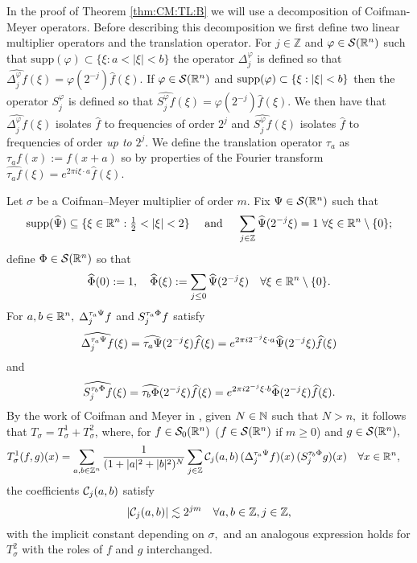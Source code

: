 In the proof of Theorem \ref{thm:CM:TL:B} we will use a decomposition of Coifman-Meyer operators. Before describing this decomposition we first define two linear multiplier operators and the translation operator.
For $j\in\mathbb{Z}$ and $\varphi \in {\mathcal{S}}({{\mathbb R}^n})$ such that $\text{supp}(\varphi) \subset \{\xi : a < |\xi| < b \}$ the operator $\Delta^\varphi_j$ is defined so that $\widehat{\Delta^\varphi_j f}(\xi) = \varphi(2^{-j})\widehat{f}(\xi)$. 
If $\varphi \in {\mathcal{S}}({{\mathbb R}^n})$ and $\text{{\rm{supp}}}(\varphi) \subset \{ \xi : |\xi| < b \}$ then the operator $S^\varphi_j$ is defined so that $\widehat{S^\varphi_j f}(\xi) = \varphi(2^{-j})\widehat{f}(\xi)$.
We then have that $\widehat{\Delta^\varphi_j f}(\xi)$ isolates $\widehat{f}$ to frequencies of order $2^j$ and $\widehat{S^\varphi_j f}(\xi)$ isolates $\widehat{f}$ to frequencies of order \textit{up to} $2^j$. 
We define the translation operator $\tau_a$ as $\tau_a f(x) := f(x+a)$ so by properties of the Fourier transform $\widehat{\tau_a f}(\xi) = e^{2\pi i \xi \cdot a} \widehat{f}(\xi)$.

Let $\sigma$ be a Coifman--Meyer multiplier of order $m.$
Fix $\Psi \in {\mathcal{S}}({{\mathbb R}^n})$ such that 
$$
{\rm{supp}}(\widehat{\Psi}) \subseteq \{ \xi \in {{\mathbb R}^n} : {\textstyle \frac{1}{2}} < |\xi| < 2 \} \quad\text{ and }\quad
\sum_{j\in\mathbb{Z}} \widehat{\Psi}(2^{-j}\xi) = 1 \,\,\forall \xi \in {{\mathbb R}^n} \setminus \{ 0 \};
$$
define $\Phi \in {\mathcal{S}}({{\mathbb R}^n})$ so that
$$
\widehat{\Phi}(0) := 1,\quad \widehat{\Phi}(\xi) := \sum_{j \le 0} \widehat{\Psi}(2^{-j}\xi)\quad \forall \xi \in {{\mathbb R}^n} \setminus \{0\}.$$
For $a,b\in{{\mathbb R}^n},$ $\Delta^{\tau_a \Psi }_{j} f$ and  $S^{ \tau_a \Phi }_{j} f$ satisfy 
$$\widehat{\Delta^{\tau_a \Psi }_{j} f}(\xi)=\widehat{\tau_a\Psi}(2^{-j}\xi)\widehat{f}(\xi)=e^{2\pi i 2^{-j}\xi\cdot a} \widehat{\Psi}(2^{-j}\xi)\widehat{f}(\xi)$$
 and   
 $$\widehat{S^{\tau_b \Phi }_{j} f}(\xi)=\widehat{\tau_b\Phi}(2^{-j}\xi)\widehat{f}(\xi)=e^{2\pi i 2^{-j}\xi\cdot b} \widehat{\Phi}(2^{-j}\xi)\widehat{f}(\xi).$$
By the work of Coifman and Meyer in \cite{MR518170},  given $N\in \mathbb{N}$ such that $N>n,$ it follows that $T_\sigma= T_\sigma^1 + T_\sigma^2$, where, for  $f\in {\mathcal{S}_0}({{\mathbb R}^n})$ ($f\in {\mathcal{S}}({{\mathbb R}^n})$ if $m\ge 0$) and $g\in{\mathcal{S}}({{\mathbb R}^n}),$
\begin{align}\label{eq:decompT1}
T_\sigma^1(f,g)(x) &= \sum_{a,b\in \mathbb{Z}^n} \frac{1}{(1+|a|^2+|b|^2)^N} \sum_{j\in\mathbb{Z}} \mathcal{C}_j(a,b) \,(\Delta^{ \tau_a \Psi }_{j} f)(x)\, (S^{ \tau_b \Phi }_{j} g )(x)\quad \forall x\in {{\mathbb R}^n},
\end{align}
 the coefficients $\mathcal{C}_j(a,b)$   satisfy
\begin{equation}\label{eq:cjbound}
\left\vert \mathcal{C}_j(a,b) \right\vert\lesssim 2^{jm}\quad \forall a,b\in\mathbb{Z}, j\in \mathbb{Z},
\end{equation}
with the implicit constant depending on $\sigma,$ and an analogous expression holds for $T_\sigma^2$ with the roles of $f$ and $g$ interchanged. 

